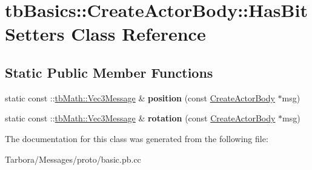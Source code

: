 \hypertarget{classtbBasics_1_1CreateActorBody_1_1HasBitSetters}{}\section{tb\+Basics\+:\+:Create\+Actor\+Body\+:\+:Has\+Bit\+Setters Class Reference}
\label{classtbBasics_1_1CreateActorBody_1_1HasBitSetters}
\subsection*{Static Public Member Functions}
\begin{DoxyCompactItemize}
\item 
\mbox{\label{classtbBasics_1_1CreateActorBody_1_1HasBitSetters_aed6dfdac3e136fafd12d0e02bb4b37d8}} 
static const \+::\hyperlink{classtbMath_1_1Vec3Message}{tb\+Math\+::\+Vec3\+Message} \& {\bfseries position} (const \hyperlink{classtbBasics_1_1CreateActorBody}{Create\+Actor\+Body} $\ast$msg)
\item 
\mbox{\label{classtbBasics_1_1CreateActorBody_1_1HasBitSetters_a17b8924ad45e961b17e9d0a32f8f2e53}} 
static const \+::\hyperlink{classtbMath_1_1Vec3Message}{tb\+Math\+::\+Vec3\+Message} \& {\bfseries rotation} (const \hyperlink{classtbBasics_1_1CreateActorBody}{Create\+Actor\+Body} $\ast$msg)
\end{DoxyCompactItemize}


The documentation for this class was generated from the following file\+:\begin{DoxyCompactItemize}
\item 
Tarbora/\+Messages/proto/basic.\+pb.\+cc\end{DoxyCompactItemize}
